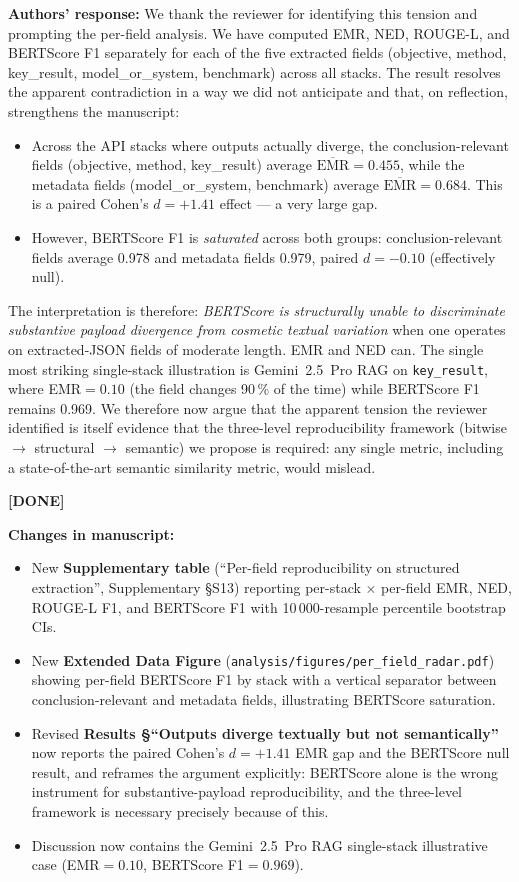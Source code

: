 \documentclass[11pt,a4paper]{article}
\newcommand{\response}[1]{\par\noindent\textbf{\color{revgreen}Authors' response:} #1\par}
\newcommand{\changes}[1]{\par\noindent\textbf{\color{revblue}Changes in manuscript:} #1\par}
\newcommand{\done}{\color{revgreen}\textbf{[DONE]}}
\begin{document}
\response{We thank the reviewer for identifying this tension and prompting the per-field analysis. We have computed EMR, NED, ROUGE-L, and BERTScore F1 separately for each of the five extracted fields (objective, method, key\_result, model\_or\_system, benchmark) across all stacks. The result resolves the apparent contradiction in a way we did not anticipate and that, on reflection, strengthens the manuscript:

\begin{itemize}[leftmargin=*]
  \item Across the API stacks where outputs actually diverge, the conclusion-relevant fields (objective, method, key\_result) average $\overline{\text{EMR}}=0.455$, while the metadata fields (model\_or\_system, benchmark) average $\overline{\text{EMR}}=0.684$. This is a paired Cohen's $d=+1.41$ effect --- a very large gap.
  \item However, BERTScore F1 is \emph{saturated} across both groups: conclusion-relevant fields average 0.978 and metadata fields 0.979, paired $d=-0.10$ (effectively null).
\end{itemize}

The interpretation is therefore: \emph{BERTScore is structurally unable to discriminate substantive payload divergence from cosmetic textual variation} when one operates on extracted-JSON fields of moderate length. EMR and NED can. The single most striking single-stack illustration is Gemini~2.5~Pro RAG on \texttt{key\_result}, where EMR$=0.10$ (the field changes 90\,\% of the time) while BERTScore F1 remains 0.969. We therefore now argue that the apparent tension the reviewer identified is itself evidence that the three-level reproducibility framework (bitwise $\to$ structural $\to$ semantic) we propose is required: any single metric, including a state-of-the-art semantic similarity metric, would mislead.} \done

\changes{
\begin{itemize}[leftmargin=*]
  \item New \textbf{Supplementary table} (``Per-field reproducibility on structured extraction'', Supplementary §S13) reporting per-stack $\times$ per-field EMR, NED, ROUGE-L F1, and BERTScore F1 with 10\,000-resample percentile bootstrap CIs.
  \item New \textbf{Extended Data Figure} (\texttt{analysis/figures/per\_field\_radar.pdf}) showing per-field BERTScore F1 by stack with a vertical separator between conclusion-relevant and metadata fields, illustrating BERTScore saturation.
  \item Revised \textbf{Results §``Outputs diverge textually but not semantically''} now reports the paired Cohen's $d=+1.41$ EMR gap and the BERTScore null result, and reframes the argument explicitly: BERTScore alone is the wrong instrument for substantive-payload reproducibility, and the three-level framework is necessary precisely because of this.
  \item Discussion now contains the Gemini~2.5~Pro RAG single-stack illustrative case (EMR$=0.10$, BERTScore F1$=0.969$).
\end{itemize}
}
\end{document}
